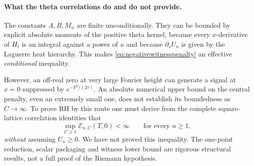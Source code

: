 \paragraph{What the theta correlations do and do not provide.}
The constants $A,B,M_n$ are finite
unconditionally.  They can be bounded
by explicit absolute moments of the
positive theta kernel, because every
$x$-derivative of $H_t$ is an integral
against a power of $u$ and because
$\partial_sU_n$ is given by the
Laguerre heat hierarchy.
This makes \eqref{eq:negativewitnesspenalty}
an effective \emph{conditional} inequality.

However, an off-real zero at very large
Fourier height can generate a signal at
$x=0$ suppressed by
$e^{-Y^2/(2\tau)}$.  An absolute
numerical upper bound on the central
penalty, even an extremely small one,
does not establish its boundedness
as $C\to\infty$.  To prove RH by this
route one must derive from the
complete square-lattice correlation
identities that
\[
\sup_{C\ge1}\mathcal E_{n,C}(T,0)<\infty
\qquad\text{for every }n\ge1,
\]
\emph{without} assuming $U_n\ge0$.
We have not proved this inequality.
The one-point reduction,
scalar packaging and witness lower bound
are rigorous structural results,
not a full proof of the Riemann hypothesis.


